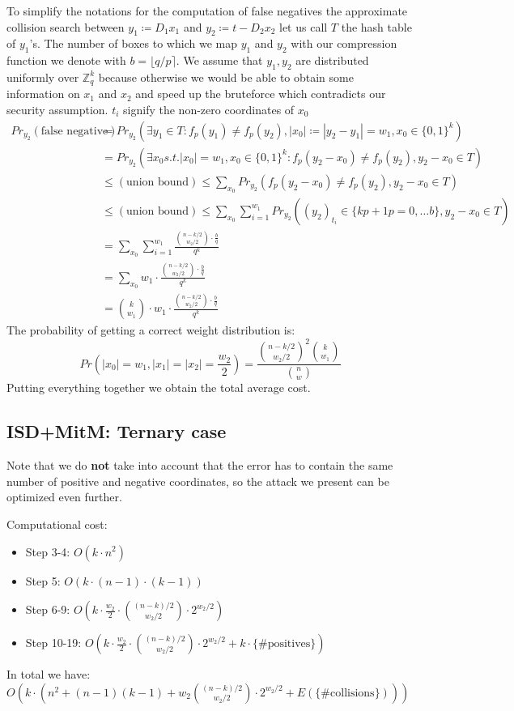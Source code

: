 \documentclass[12pt]{article}
\newcommand{\ZZ}{\mathbb{Z}}
\begin{document}
To simplify the notations for the computation of false negatives the approximate collision search between $y_1 \coloneqq D_1x_1$ and $y_2 \coloneqq t-D_2x_2$ let us call $T$ the hash table of $y_1$'s. The number of boxes to which we map $y_1$ and $y_2$ with our compression function we denote with $b = \lfloor q/p \rceil$. We assume that $y_1, y_2$ are distributed uniformly over $\ZZ_q^{k}$ because otherwise we would be able to obtain some information on $x_1$ and $x_2$ and speed up the bruteforce which contradicts our security assumption. $t_i$ signify the non-zero coordinates of $x_0$
\[
\begin{split}
    Pr_{y_2}(\text{false negative}) & = Pr_{y_2}(\exists y_1 \in T: f_p(y_1) \neq f_p(y_2), |x_0| \coloneqq |y_2 - y_1| = w_1, x_0 \in \{0,1\}^{k}) \\
    & = Pr_{y_2}(\exists x_0 s.t. |x_0| = w_1, x_0 \in\{0,1\}^{k}: f_p(y_2 - x_0) \neq f_p(y_2), y_2 - x_0 \in T) \\
    & \leq (\text{union bound}) \leq \sum_{x_0} Pr_{y_2}(f_p(y_2 - x_0) \neq f_p(y_2), y_2 - x_0 \in T) \\
    & \leq (\text{union bound}) \leq \sum_{x_0} \sum_{i = 1}^{w_1} Pr_{y_2}((y_2)_{t_i} \in \{kp+1 p=0, \dots b\}, y_2 - x_0 \in T) \\
    & = \sum_{x_0} \sum_{i = 1}^{w_1} \frac{\binom{n-k/2}{w_2/2} \cdot \frac{b}{q}}{q^k} \\
    & = \sum_{x_0} w_1 \cdot \frac{\binom{n-k/2}{w_2/2} \cdot \frac{b}{q}}{q^k} \\
    & = \binom{k}{w_1} \cdot w_1 \cdot \frac{\binom{n-k/2}{w_2/2} \cdot \frac{b}{q}}{q^k}
\end{split}
\]
The probability of getting a correct weight distribution is:
\[
    Pr(|x_0| = w_1, |x_1| = |x_2| = \frac{w_2}{2}) = \frac{\binom{n-k/2}{w_2/2}^{2}\binom{k}{w_1}}{\binom{n}{w}}
\]
Putting everything together we obtain the total average cost.

\subsection{ISD+MitM: Ternary case}
Note that we do \textbf{not} take into account that the error has to contain the same number of positive and negative coordinates, so the attack we present can be optimized even further.

Computational cost:
\begin{itemize}
    \item Step 3-4: $O(k \cdot n^2)$
    \item Step 5: $O(k \cdot (n-1) \cdot (k-1))$
    \item Step 6-9: $O(k \cdot \frac{w_2}{2} \cdot \binom{(n-k)/2}{w_2/2} \cdot 2^{w_2/2})$
    \item Step 10-19: $O(k \cdot \frac{w_2}{2} \cdot \binom{(n-k)/2}{w_2/2} \cdot 2^{w_2/2} + k \cdot \{\text{\# positives}\})$
\end{itemize}
In total we have: $O(k \cdot (n^2 + (n-1)(k-1) + w_2\binom{(n-k)/2}{w_2/2} \cdot 2^{w_2/2} + E(\{\text{\# collisions}\})))$
\end{document}
